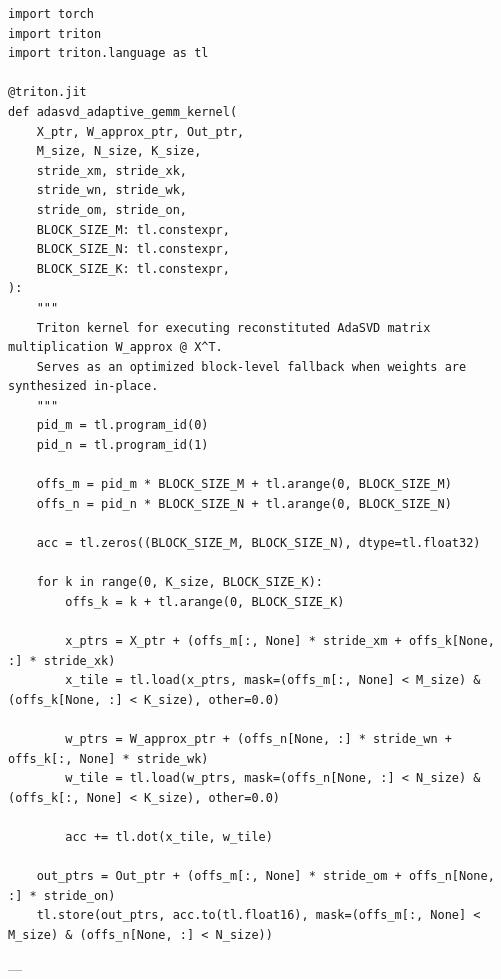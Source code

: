 \begin{lstlisting}
import torch
import triton
import triton.language as tl

@triton.jit
def adasvd_adaptive_gemm_kernel(
    X_ptr, W_approx_ptr, Out_ptr,
    M_size, N_size, K_size,
    stride_xm, stride_xk,
    stride_wn, stride_wk,
    stride_om, stride_on,
    BLOCK_SIZE_M: tl.constexpr,
    BLOCK_SIZE_N: tl.constexpr,
    BLOCK_SIZE_K: tl.constexpr,
):
    """
    Triton kernel for executing reconstituted AdaSVD matrix multiplication W_approx @ X^T.
    Serves as an optimized block-level fallback when weights are synthesized in-place.
    """
    pid_m = tl.program_id(0)
    pid_n = tl.program_id(1)

    offs_m = pid_m * BLOCK_SIZE_M + tl.arange(0, BLOCK_SIZE_M)
    offs_n = pid_n * BLOCK_SIZE_N + tl.arange(0, BLOCK_SIZE_N)

    acc = tl.zeros((BLOCK_SIZE_M, BLOCK_SIZE_N), dtype=tl.float32)

    for k in range(0, K_size, BLOCK_SIZE_K):
        offs_k = k + tl.arange(0, BLOCK_SIZE_K)

        x_ptrs = X_ptr + (offs_m[:, None] * stride_xm + offs_k[None, :] * stride_xk)
        x_tile = tl.load(x_ptrs, mask=(offs_m[:, None] < M_size) & (offs_k[None, :] < K_size), other=0.0)

        w_ptrs = W_approx_ptr + (offs_n[None, :] * stride_wn + offs_k[:, None] * stride_wk)
        w_tile = tl.load(w_ptrs, mask=(offs_n[None, :] < N_size) & (offs_k[:, None] < K_size), other=0.0)

        acc += tl.dot(x_tile, w_tile)

    out_ptrs = Out_ptr + (offs_m[:, None] * stride_om + offs_n[None, :] * stride_on)
    tl.store(out_ptrs, acc.to(tl.float16), mask=(offs_m[:, None] < M_size) & (offs_n[None, :] < N_size))
\end{lstlisting}


---